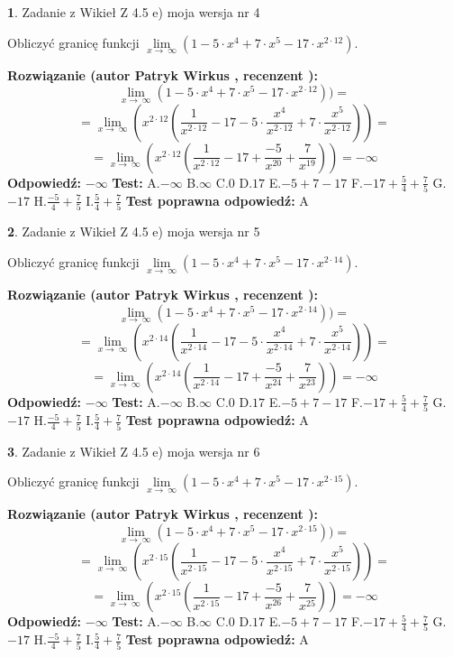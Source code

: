 \documentclass[12pt, a4paper]{article}
\theoremstyle{definition} %
\newtheorem{zad}{}
\newcommand{\zadStart}[1]{\begin{zad}#1\newline}
\newcommand{\zadStop}{\end{zad}}
\newcommand{\rozwStart}[2]{\noindent \textbf{Rozwiązanie (autor #1 , recenzent #2): }\newline}
\newcommand{\rozwStop}{\newline}
\newcommand{\odpStart}{\noindent \textbf{Odpowiedź:}\newline}
\newcommand{\odpStop}{\newline}
\newcommand{\testStart}{\noindent \textbf{Test:}\newline}
\newcommand{\testStop}{\newline}
\newcommand{\kluczStart}{\noindent \textbf{Test poprawna odpowiedź:}\newline}
\newcommand{\kluczStop}{\newline}
\begin{document}
\zadStart{Zadanie z Wikieł Z 4.5 e) moja wersja nr 4}



Obliczyć granicę funkcji  $\lim\limits_{x\to\ \infty}(1 - 5 \cdot x^{4}+7 \cdot x^{5}- 17 \cdot x^{2\cdot12})$.
\zadStop
\rozwStart{Patryk Wirkus}{}
$$\lim\limits_{x\to\ \infty}(1 - 5 \cdot x^{4}+7 \cdot x^{5}- 17 \cdot x^{2\cdot12}))=$$
$$=\lim\limits_{x\to\ \infty}(x^{2\cdot12}(\frac{1}{x^{2\cdot12}}-17 -5 \cdot \frac{x^{4}}{x^{2\cdot12}}+7 \cdot \frac{x^{5}}{x^{2\cdot12}}))=$$
$$=\lim\limits_{x\to\ \infty}(x^{2\cdot12}(\frac{1}{x^{2\cdot12}}-17 + \frac{-5}{x^{20}}+ \frac{7}{x^{19}}))=-\infty$$
\rozwStop
\odpStart
$-\infty$
\odpStop
\testStart
A.$-\infty$ B.$\infty$ C.$0$ D.$17$ E.$-5 + 7 - 17$
F.$-17+\frac{5}{4}+\frac{7}{5}$ G.$-17$
H.$\frac{-5}{4}+\frac{7}{5}$
I.$\frac{5}{4}+\frac{7}{5}$
\testStop
\kluczStart
A
\kluczStop



\zadStart{Zadanie z Wikieł Z 4.5 e) moja wersja nr 5}



Obliczyć granicę funkcji  $\lim\limits_{x\to\ \infty}(1 - 5 \cdot x^{4}+7 \cdot x^{5}- 17 \cdot x^{2\cdot14})$.
\zadStop
\rozwStart{Patryk Wirkus}{}
$$\lim\limits_{x\to\ \infty}(1 - 5 \cdot x^{4}+7 \cdot x^{5}- 17 \cdot x^{2\cdot14}))=$$
$$=\lim\limits_{x\to\ \infty}(x^{2\cdot14}(\frac{1}{x^{2\cdot14}}-17 -5 \cdot \frac{x^{4}}{x^{2\cdot14}}+7 \cdot \frac{x^{5}}{x^{2\cdot14}}))=$$
$$=\lim\limits_{x\to\ \infty}(x^{2\cdot14}(\frac{1}{x^{2\cdot14}}-17 + \frac{-5}{x^{24}}+ \frac{7}{x^{23}}))=-\infty$$
\rozwStop
\odpStart
$-\infty$
\odpStop
\testStart
A.$-\infty$ B.$\infty$ C.$0$ D.$17$ E.$-5 + 7 - 17$
F.$-17+\frac{5}{4}+\frac{7}{5}$ G.$-17$
H.$\frac{-5}{4}+\frac{7}{5}$
I.$\frac{5}{4}+\frac{7}{5}$
\testStop
\kluczStart
A
\kluczStop



\zadStart{Zadanie z Wikieł Z 4.5 e) moja wersja nr 6}



Obliczyć granicę funkcji  $\lim\limits_{x\to\ \infty}(1 - 5 \cdot x^{4}+7 \cdot x^{5}- 17 \cdot x^{2\cdot15})$.
\zadStop
\rozwStart{Patryk Wirkus}{}
$$\lim\limits_{x\to\ \infty}(1 - 5 \cdot x^{4}+7 \cdot x^{5}- 17 \cdot x^{2\cdot15}))=$$
$$=\lim\limits_{x\to\ \infty}(x^{2\cdot15}(\frac{1}{x^{2\cdot15}}-17 -5 \cdot \frac{x^{4}}{x^{2\cdot15}}+7 \cdot \frac{x^{5}}{x^{2\cdot15}}))=$$
$$=\lim\limits_{x\to\ \infty}(x^{2\cdot15}(\frac{1}{x^{2\cdot15}}-17 + \frac{-5}{x^{26}}+ \frac{7}{x^{25}}))=-\infty$$
\rozwStop
\odpStart
$-\infty$
\odpStop
\testStart
A.$-\infty$ B.$\infty$ C.$0$ D.$17$ E.$-5 + 7 - 17$
F.$-17+\frac{5}{4}+\frac{7}{5}$ G.$-17$
H.$\frac{-5}{4}+\frac{7}{5}$
I.$\frac{5}{4}+\frac{7}{5}$
\testStop
\kluczStart
A
\kluczStop
\end{document}
